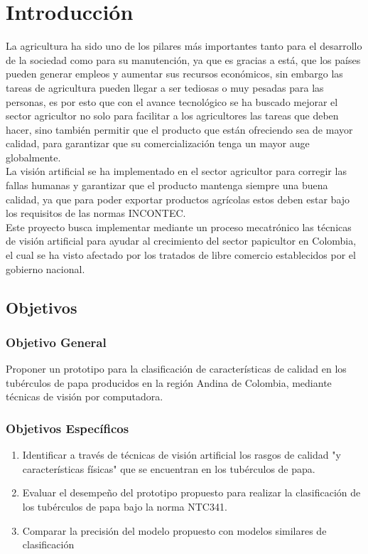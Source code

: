 \cleardoublepage %

\chapter{Introducción}

La agricultura ha sido uno de los pilares más importantes tanto para el desarrollo de la sociedad como para su manutención, ya que es gracias a está, que los países pueden generar empleos y aumentar sus recursos económicos, sin embargo las tareas de agricultura pueden llegar a ser tediosas o muy pesadas para las personas, es por esto que con el avance tecnológico se ha buscado mejorar el sector agricultor no solo para facilitar a los agricultores las tareas que deben hacer, sino también permitir que el producto que están ofreciendo sea de mayor calidad, para garantizar que su comercialización tenga un mayor auge globalmente.
\\
La visión artificial se ha implementado en el sector agricultor para corregir las fallas humanas y garantizar que el producto mantenga siempre una buena calidad, ya que para poder exportar productos agrícolas estos deben estar bajo los requisitos de las normas INCONTEC.
\\
Este proyecto busca implementar mediante un proceso mecatrónico las técnicas de visión artificial para ayudar al crecimiento del sector papicultor en Colombia, el cual se ha visto afectado por los tratados de libre comercio establecidos por el gobierno nacional. 


\newpage
\section{Objetivos}

\subsection{Objetivo General}

Proponer un prototipo para la clasificación de características de calidad en los tubérculos de papa producidos en la región Andina de Colombia, mediante técnicas de visión por computadora.

\subsection{Objetivos Específicos}
\begin{enumerate}
	\item Identificar a través de técnicas de visión artificial los rasgos de calidad "y características físicas" que se encuentran en los tubérculos de papa. 
	\item Evaluar el desempeño del prototipo propuesto para realizar la clasificación de los tubérculos de papa bajo la norma NTC341. 
	\item Comparar la precisión del modelo propuesto con modelos similares de clasificación
\end{enumerate}

